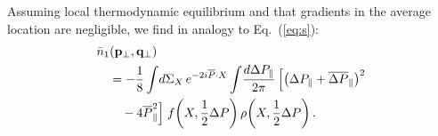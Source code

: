 \documentclass[reprint,superscriptaddress,english,preprintnumbers,amsmath,amssymb,aps,prx]{revtex4-2}
\def\Eq#1{Eq.~(\ref{#1})}
\begin{document}
\begin{appendix}
Assuming local thermodynamic equilibrium and that gradients in the average location are negligible, we find in analogy to \Eq{eq:s}:
\begin{align}\label{eq:barn}
\begin{split}
&\bar n_1(\bold{p}_\perp,\bold{q}_\perp)\\
&\quad= -\frac{1}{8}\int\!d\Sigma_X\, e^{-2i\overline{P} \cdot X} \int\!\frac{d\Delta P_\parallel}{2\pi}\, \Big[\big(\Delta P_\parallel + \overline{\Delta P}_\parallel  \big)^2\\
&\quad\quad- 4 \overline{P}_\parallel^2 \Big]\; f\bigg(X,\frac{1}{2}\Delta P\bigg)\,\rho\bigg( X,\frac{1}{2}\Delta P \bigg)\,.
\end{split}
\end{align}

\end{appendix}
\hfill

\end{document}
